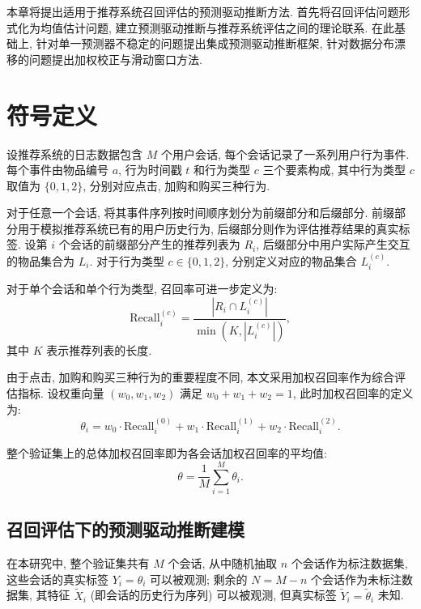 \documentclass[a4paper, AutoFakeBold, UTF8]{ctexrep}
\theoremstyle{plain}
\numberwithin{equation}{chapter}
\begin{document}
本章将提出适用于推荐系统召回评估的预测驱动推断方法. 首先将召回评估问题形式化为均值估计问题, 建立预测驱动推断与推荐系统评估之间的理论联系. 在此基础上, 针对单一预测器不稳定的问题提出集成预测驱动推断框架, 针对数据分布漂移的问题提出加权校正与滑动窗口方法. 

\section{符号定义}

设推荐系统的日志数据包含 $M$ 个用户会话, 每个会话记录了一系列用户行为事件. 每个事件由物品编号 $a$, 行为时间戳 $t$ 和行为类型 $c$ 三个要素构成, 其中行为类型 $c$ 取值为 $\{0, 1, 2\}$, 分别对应点击, 加购和购买三种行为. 

对于任意一个会话, 将其事件序列按时间顺序划分为前缀部分和后缀部分. 前缀部分用于模拟推荐系统已有的用户历史行为, 后缀部分则作为评估推荐结果的真实标签. 设第 $i$ 个会话的前缀部分产生的推荐列表为 $R_i$, 后缀部分中用户实际产生交互的物品集合为 $L_i$. 对于行为类型 $c \in \{0, 1, 2\}$, 分别定义对应的物品集合 $L_i^{ (c) }$. 

对于单个会话和单个行为类型, 召回率可进一步定义为: 
\begin{equation}
\text{Recall}_{i}^{ (c) } = \frac{|R_i \cap L_i^{ (c) }|}{\min (K, |L_i^{ (c) }|) }, \label{eq: recall}
\end{equation}
其中 $K$ 表示推荐列表的长度. 

由于点击, 加购和购买三种行为的重要程度不同, 本文采用加权召回率作为综合评估指标. 设权重向量 $ (w_0, w_1, w_2) $ 满足 $w_0 + w_1 + w_2 = 1$, 此时加权召回率的定义为: 
\begin{equation}
\theta_i = w_0 \cdot \text{Recall}_{i}^{ (0) } + w_1 \cdot \text{Recall}_{i}^{ (1) } + w_2 \cdot \text{Recall}_{i}^{ (2) }. \label{eq: weighted_recall_i}
\end{equation}

整个验证集上的总体加权召回率即为各会话加权召回率的平均值: 
\begin{equation}
\theta = \frac{1}{M} \sum_{i=1}^{M} \theta_i. \label{eq: theta}
\end{equation}

\subsection{召回评估下的预测驱动推断建模}

在本研究中, 整个验证集共有 $M$ 个会话, 从中随机抽取 $n$ 个会话作为标注数据集, 这些会话的真实标签 $Y_i = \theta_i$ 可以被观测; 剩余的 $N = M - n$ 个会话作为未标注数据集, 其特征 $\tilde{X}_i$ (即会话的历史行为序列) 可以被观测, 但真实标签 $\tilde{Y}_i = \tilde{\theta}_i$ 未知. 
\end{document}
